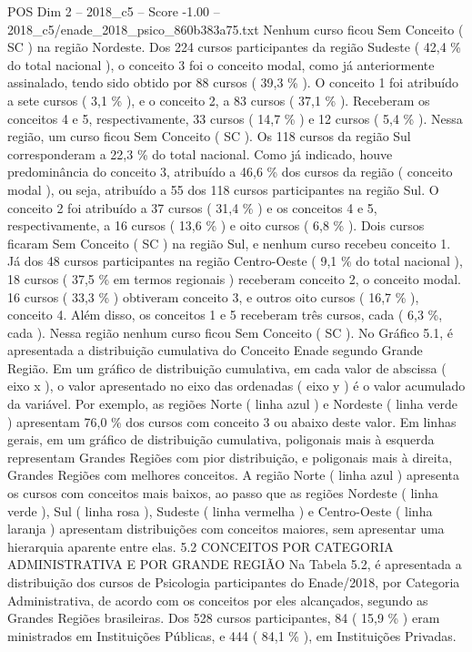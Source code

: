 \begin{textsample}{POS Dim 2 – 2018\_c5 – Score -1.00 – 2018\_c5/enade\_2018\_psico\_860b383a75.txt}
Nenhum curso ficou Sem Conceito ( SC ) na região Nordeste.
Dos 224 cursos participantes da região Sudeste ( 42,4 \% do total nacional ), o conceito 3 foi o conceito modal, como já anteriormente assinalado, tendo sido obtido por 88 cursos ( 39,3 \% ).
O conceito 1 foi atribuído a sete cursos ( 3,1 \% ), e o conceito 2, a 83 cursos ( 37,1 \% ).
Receberam os conceitos 4 e 5, respectivamente, 33 cursos ( 14,7 \% ) e 12 cursos ( 5,4 \% ).
Nessa região, um curso ficou Sem Conceito ( SC ).
Os 118 cursos da região Sul corresponderam a 22,3 \% do total nacional.
Como já indicado, houve predominância do conceito 3, atribuído a 46,6 \% dos cursos da região ( conceito modal ), ou seja, atribuído a 55 dos 118 cursos participantes na região Sul.
O conceito 2 foi atribuído a 37 cursos ( 31,4 \% ) e os conceitos 4 e 5, respectivamente, a 16 cursos ( 13,6 \% ) e oito cursos ( 6,8 \% ).
Dois cursos ficaram Sem Conceito ( SC ) na região Sul, e nenhum curso recebeu conceito 1.
Já dos 48 cursos participantes na região Centro-Oeste ( 9,1 \% do total nacional ), 18 cursos ( 37,5 \% em termos regionais ) receberam conceito 2, o conceito modal. 16 cursos ( 33,3 \% ) obtiveram conceito 3, e outros oito cursos ( 16,7 \% ), conceito 4.
Além disso, os conceitos 1 e 5 receberam três cursos, cada ( 6,3 \%, cada ).
Nessa região nenhum curso ficou Sem Conceito ( SC ).
No Gráfico 5.1, é apresentada a distribuição cumulativa do Conceito Enade segundo Grande Região.
Em um gráfico de distribuição cumulativa, em cada valor de abscissa ( eixo x ), o valor apresentado no eixo das ordenadas ( eixo y ) é o valor acumulado da variável.
Por exemplo, as regiões Norte ( linha azul ) e Nordeste ( linha verde ) apresentam 76,0 \% dos cursos com conceito 3 ou abaixo deste valor.
Em linhas gerais, em um gráfico de distribuição cumulativa, poligonais mais à esquerda representam Grandes Regiões com pior distribuição, e poligonais mais à direita, Grandes Regiões com melhores conceitos.
A região Norte ( linha azul ) apresenta os cursos com conceitos mais baixos, ao passo que as regiões Nordeste ( linha verde ), Sul ( linha rosa ), Sudeste ( linha vermelha ) e Centro-Oeste ( linha laranja ) apresentam distribuições com conceitos maiores, sem apresentar uma hierarquia aparente entre elas. 5.2 CONCEITOS POR CATEGORIA ADMINISTRATIVA E POR GRANDE REGIÃO Na Tabela 5.2, é apresentada a distribuição dos cursos de Psicologia participantes do Enade/2018, por Categoria Administrativa, de acordo com os conceitos por eles alcançados, segundo as Grandes Regiões brasileiras.
Dos 528 cursos participantes, 84 ( 15,9 \% ) eram ministrados em Instituições Públicas, e 444 ( 84,1 \% ), em Instituições Privadas.

\end{textsample}
